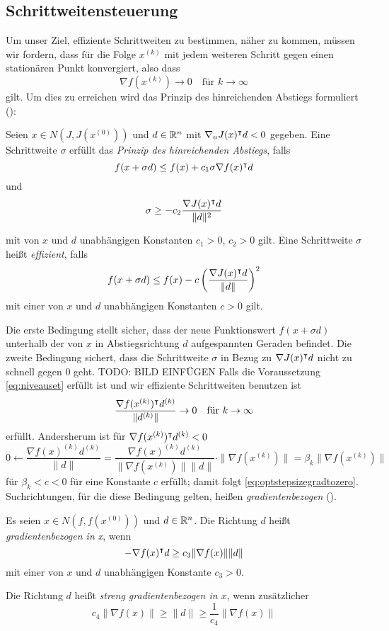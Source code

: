 \subsection{Schrittweitensteuerung}
Um unser Ziel, effiziente Schrittweiten zu bestimmen, näher zu kommen, müssen wir fordern, dass für die Folge $x^{(k)}$ mit jedem weiteren Schritt gegen einen stationären Punkt konvergiert, also dass  
\begin{equation}
\label{eq:optstepsizegradtozero}
 \nabla f(x^{(k)})\to 0 \quad \text{für }k\to \infty
\end{equation}
gilt. Um dies zu erreichen wird das Prinzip des hinreichenden Abstiegs formuliert (\cite[Def. 4.4.2]{alt2002nichtlineare}):
\begin{definition}
\label{def:sufficientdescent}
 Seien $x\in N(J,J(x^{(0)}))$ und $d\in \mathbb{R}^n$ mit $\nabla_u J(x)^\intercal d<0$ gegeben. Eine Schrittweite $\sigma$ erfüllt das \textit{Prinzip des hinreichenden Abstiegs}, falls
 \begin{equation}
 \label{eq:armijo1}
  f(x+\sigma d) \leq f(x) + c_1\sigma \nabla f(x)^\intercal d
 \end{equation}
 und 
 \begin{equation}
\label{eq:armijo2}
 \sigma \geq -c_2 \frac{\nabla J(x)^\intercal d}{\|d\|^2}
 \end{equation}


mit von $x$ und $d$ unabhängigen Konstanten $c_1>0$, $c_2>0$ gilt. Eine Schrittweite $\sigma$ heißt \textit{effizient}, falls
\[
 f(x+\sigma d) \leq f(x) - c\left( \frac{\nabla J(x)^\intercal d}{\|d\|}\right)^2
\]
mit einer von $x$ und $d$ unabhängigen Konstanten $c>0$ gilt.
\end{definition}
Die erste Bedingung stellt sicher, dass der neue Funktionswert $f(x+\sigma d)$ unterhalb der von $x$ in Abstiegsrichtung $d$ aufgespannten Geraden befindet. Die zweite Bedingung sichert, dass die Schrittweite $\sigma$ in Bezug zu $\nabla J(x)^\intercal d$ nicht zu schnell gegen $0$ geht.
TODO: BILD EINFÜGEN
Falls die Voraussetzung \eqref{eq:niveauset} erfüllt ist und wir effiziente Schrittweiten benutzen ist 
\[
 \frac{\nabla f(x^{(k)})^\intercal d^{(k)}}{\|d^{(k)}\|} \to 0 \quad \text{für }k\to \infty
\]
erfüllt. Andersherum ist für $\nabla f(x^{(k)})^\intercal d^{(k)}<0$
\[
 0 \leftarrow \frac{\nabla f(x)^{(k)} d^{(k)}}{\|d\|} = \frac{\nabla f(x)^{(k)} d^{(k)}}{\|\nabla f(x^{(k)})\|\|d\|}\cdot \|\nabla f(x^{(k)})\| = \beta_k \|\nabla f(x^{(k)})\|
\]
für $\beta_k<c<0$ für eine Konstante $c$ erfüllt; damit folgt \eqref{eq:optstepsizegradtozero}. Suchrichtungen, für die diese Bedingung gelten, heißen \textit{gradientenbezogen} (\cite[Def. 4.4.4]{alt2002nichtlineare}).
\begin{definition}
 Es seien $x\in N(f,f(x^{(0)}))$ und $d\in \mathbb{R}^n$. Die Richtung $d$ heißt \textit{gradientenbezogen in x}, wenn
 \[
  -\nabla f(x)^\intercal d\geq c_3\|\nabla f(x)\| \|d\|
 \]
mit einer von $x$ und $d$ unabhängigen Konstante $c_3>0$.

Die Richtung $d$ heißt \textit{streng gradientenbezogen in $x$}, wenn zusätzlicher 
\[
 c_4\|\nabla f(x)\| \geq \|d\| \geq \frac{1}{c_4}\|\nabla f(x)\| 
\]

\end{definition}

